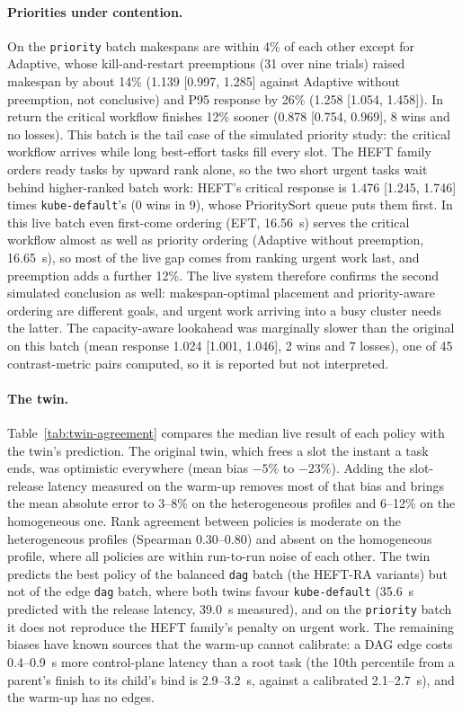 \documentclass[12pt,a4paper]{report}
\newcommand{\pol}[1]{\texttt{#1}}
\begin{document}
\paragraph{Priorities under contention.} On the \texttt{priority} batch
makespans are within 4\% of each other except for Adaptive, whose
kill-and-restart preemptions (31 over nine trials) raised makespan by
about 14\% (1.139 [0.997, 1.285] against Adaptive without preemption, not
conclusive) and P95 response by 26\% (1.258 [1.054, 1.458]). In return the
critical workflow finishes 12\% sooner (0.878 [0.754, 0.969], 8 wins and
no losses). This batch is the tail case of the simulated priority study:
the critical workflow arrives while long best-effort tasks fill every
slot. The HEFT family orders ready tasks by upward rank alone, so the two
short urgent tasks wait behind higher-ranked batch work: HEFT's critical
response is 1.476 [1.245, 1.746] times \pol{kube-default}'s (0 wins in 9),
whose PrioritySort queue puts them first. In this live batch even
first-come ordering (EFT, 16.56~s) serves the critical workflow almost as
well as priority ordering (Adaptive without preemption, 16.65~s), so most
of the live gap comes from ranking urgent work last, and preemption adds a
further 12\%. The live system therefore confirms the second simulated
conclusion as well: makespan-optimal placement and priority-aware ordering
are different goals, and urgent work arriving into a busy cluster needs
the latter. The capacity-aware lookahead was marginally slower than the
original on this batch (mean response 1.024 [1.001, 1.046], 2 wins and 7
losses), one of 45 contrast-metric pairs computed, so it is reported but
not interpreted.

\paragraph{The twin.} Table~\ref{tab:twin-agreement} compares the median
live result of each policy with the twin's prediction. The original twin,
which frees a slot the instant a task ends, was optimistic everywhere
(mean bias $-5\%$ to $-23\%$). Adding the slot-release latency measured
on the warm-up removes most of that bias and brings the mean absolute
error to 3--8\% on the heterogeneous profiles and 6--12\% on the
homogeneous one. Rank agreement between policies is moderate on the
heterogeneous profiles (Spearman 0.30--0.80) and absent on the homogeneous
profile, where all policies are within run-to-run noise of each other.
The twin predicts the best policy of the balanced \texttt{dag} batch
(the HEFT-RA variants) but not of the edge \texttt{dag} batch, where both
twins favour \pol{kube-default} (35.6~s predicted with the release
latency, 39.0~s measured), and on
the \texttt{priority} batch it does not reproduce the HEFT family's
penalty on urgent work. The remaining biases have known sources that the
warm-up cannot calibrate: a DAG edge costs 0.4--0.9~s more control-plane
latency than a root task (the 10th percentile from a parent's finish to its
child's bind is 2.9--3.2~s, against a calibrated 2.1--2.7~s), and the
warm-up has no edges.
\end{document}
